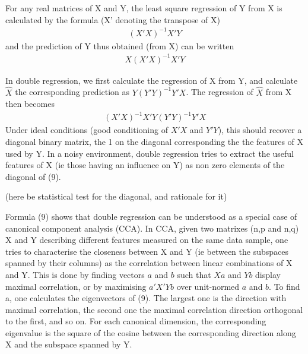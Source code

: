 \documentclass{article}
\begin{document}
For any real matrices of X and Y, the least square regression of Y from X is calculated by the formula (X' denoting the transpose of X)
\begin{equation}
\begin{aligned}
(X'X)^{-1} X'Y
\end{aligned}
\end{equation}
and the prediction of Y thus obtained (from X) can be written
\begin{equation}
\begin{aligned}
X(X'X)^{-1} X'Y
\end{aligned}
\end{equation}
 
In double regression, we first calculate the regression of X from Y, and calculate $\hat X$ the corresponding prediction as $Y(Y'Y)^{-1} Y'X$. The regression of $\hat X$ from X then becomes
\begin{equation}
\begin{aligned}
(X'X)^{-1} X'Y(Y'Y)^{-1} Y'X
\end{aligned}
\end{equation}
Under ideal conditions (good conditioning of $X'X$ and $Y'Y$), this should recover a diagonal binary matrix, the 1 on the diagonal corresponding the the features of X used by Y. In a noisy environment, double regression tries to extract the useful features of X (ie those having an influence on Y) as non zero elements of the diagonal of (9).


(here be statistical test for the diagonal, and rationale for it)



Formula (9) shows that double regression can be understood as a special case of canonical component analysis (CCA). In CCA, given two matrixes (n,p and n,q) X and Y describing different features measured on the same data sample, one tries to characterise the closeness between X and Y (ie between the subspaces spanned by their columns) as the correlation between linear combinations of X and Y. This is done by finding vectors $a$ and $b$ such that $Xa$ and $Yb$ display maximal correlation, or by maximising $a'X'Yb$ over unit-normed $a$ and $b$. To find a, one calculates the eigenvectors of (9). The largest one is the direction with maximal correlation, the second one the maximal correlation direction orthogonal to the first, and so on. For each canonical dimension, the corresponding eigenvalue is the square of the cosine between the corresponding direction along X and the subspace spanned by Y.  
\end{document}
